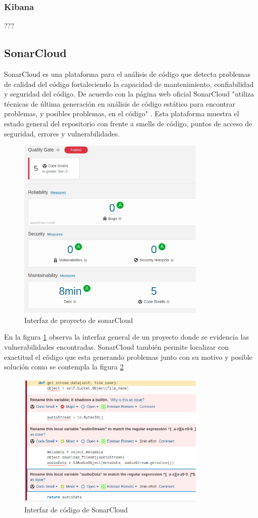 \subsubsection {Kibana}
???
\subsection{SonarCloud}

SonarCloud es una plataforma para el análisis de código que detecta problemas de calidad del código fortaleciendo la capacidad de mantenimiento, confiabilidad y seguridad del código. De acuerdo con la página web oficial SonarCloud "utiliza técnicas de última generación en análisis de código estático para encontrar problemas, y posibles problemas, en el código" \cite{sonarcloud}.
Esta plataforma muestra el estado general del repositorio con frente a smells de código, puntos de acceso de seguridad, errores y vulnerabilidades.

\begin{figure}[H]
	\centering
	\includegraphics[width=0.8\textwidth]{bibliografia/Imagenes/SonarCloud.png}
	\caption{Interfaz de proyecto de sonarCloud}
	\label{sonarOne}
\end{figure}

En la figura \ref{sonarOne} observa la interfaz general de un proyecto donde se evidencia las vulnerabilidades encontradas. SonarCloud también permite localizar con exactitud el código que esta generando problemas junto con su motivo y posible solución como se contempla la figura \ref{sonarTwo}

\begin{figure}[H]
	\centering
	\includegraphics[width=0.8\textwidth]{bibliografia/Imagenes/Sonarbugs.png}
	\caption{Interfaz de código de SonarCloud}
	\label{sonarTwo}
\end{figure}